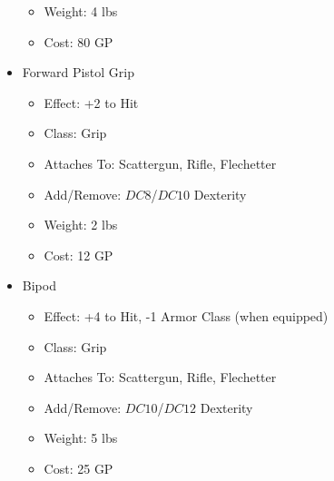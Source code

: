 \documentclass[12pt, landscape]{article}
\begin{document}
\begin{FlushLeft}
\begin{multicols}{2}
\begin{itemize}[wide]
\begin{itemize}
					\item Weight: 4 lbs
					\item Cost: 80 GP
				\end{itemize}
				\item Forward Pistol Grip
				\begin{itemize}
					\item Effect: +2 to Hit
					\item Class: Grip
					\item Attaches To: Scattergun, Rifle, Flechetter 
					\item Add/Remove: $DC8$/$DC10$ Dexterity
					\item Weight: 2 lbs
					\item Cost: 12 GP
				\end{itemize}
				\item Bipod
				\begin{itemize}
					\item Effect: +4 to Hit, -1 Armor Class (when equipped)
					\item Class: Grip
					\item Attaches To: Scattergun, Rifle, Flechetter 
					\item Add/Remove: $DC10$/$DC12$ Dexterity
					\item Weight: 5 lbs
					\item Cost: 25 GP
				\end{itemize}
			\end{itemize}
			\vfill


\end{multicols}
\end{FlushLeft}
\end{document}
